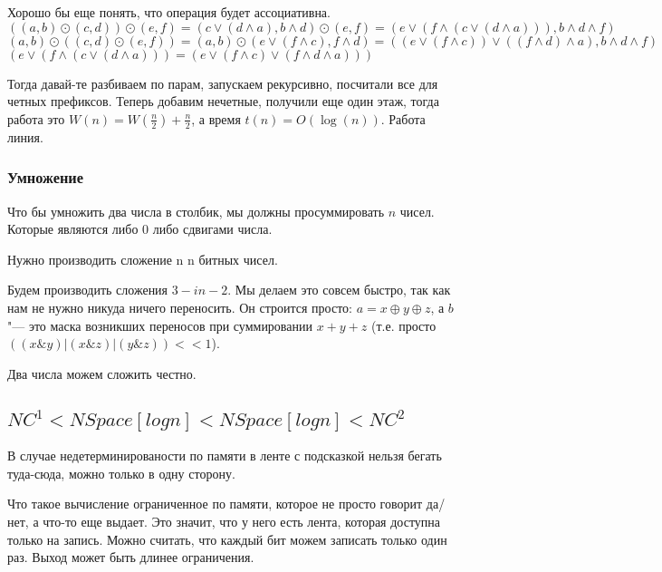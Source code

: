 Хорошо бы еще понять, что операция будет ассоциативна. 
$((a, b) \odot (c, d)) \odot (e, f) = (c \vee (d \wedge a), b \wedge d) \odot (e, f) = (e \vee (f \wedge (c \vee (d \wedge a))), b \wedge d \wedge f)$\\
$(a, b) \odot ((c, d) \odot (e, f)) = (a, b) \odot (e \vee (f \wedge c), f \wedge d) = ((e \vee (f \wedge c)) \vee ((f \wedge d) \wedge a), b \wedge d \wedge f)$\\
$(e \vee (f \wedge (c \vee (d \wedge a))) = (e \vee (f \wedge c) \vee (f \wedge d \wedge a)))$

Тогда давай-те разбиваем по парам, запускаем рекурсивно, посчитали все для четных префиксов. 
Теперь добавим нечетные, получили еще один этаж, тогда работа это $W(n) = W(\frac{n}{2}) + \frac{n}{2}$, а время $t(n) = O(\log (n))$. 
Работа линия.

\subsubsection{Умножение} 
Что бы умножить два числа в столбик, мы должны просуммировать $n$ чисел. 
Которые являются либо 0 либо сдвигами числа. 

Нужно производить сложение n n битных чисел. 

Будем производить сложения $3-in-2$.
Мы делаем это совсем быстро, так как нам не нужно никуда ничего переносить.
Он строится просто: $a = x \oplus y \oplus z$, а $b$ "--- это маска возникших переносов при суммировании $x+y+z$ (т.е. просто $((x \& y) | (x \& z) | (y \& z)) << 1$).

Два числа можем сложить честно.

\subsection{$NC^1 < NSpace[log n] < NSpace[log n] < NC^2$}

\begin{Rem}
	В случае недетерминированости по памяти в ленте с подсказкой нельзя бегать туда-сюда, можно только в одну сторону.
\end{Rem}

\begin{Rem}
	Что такое вычисление ограниченное по памяти, которое не просто говорит да/нет, а что-то еще выдает. Это значит, что у него 
	есть лента, которая доступна только на запись. Можно считать, что каждый бит можем записать только один раз. Выход может быть длинее 
	ограничения. 
\end{Rem}

